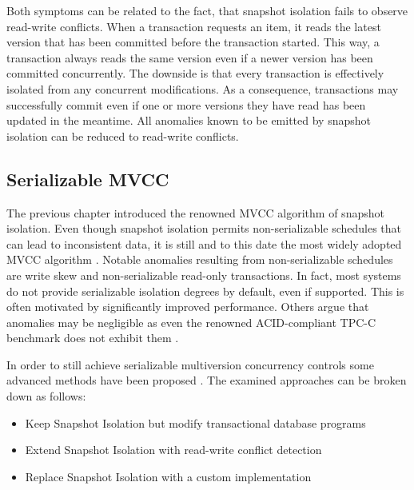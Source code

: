 Both symptoms can be related to the fact, that snapshot isolation fails to
observe read-write conflicts. When a transaction requests an item, it reads the
latest version that has been committed before the transaction started. This way,
a transaction always reads the same version even if a newer version has been
committed concurrently. The downside is that every transaction is effectively
isolated from any concurrent modifications. As a consequence, transactions may
successfully commit even if one or more versions they have read has been updated
in the meantime. All anomalies known to be emitted by snapshot isolation can be
reduced to read-write conflicts.

\subsection{Serializable MVCC}

The previous chapter introduced the renowned MVCC algorithm of snapshot
isolation. Even though snapshot isolation permits non-serializable schedules
that can lead to inconsistent data, it is still and to this date the most widely
adopted MVCC algorithm \cite{cahill2009serializable, larson2011high,
sikka2012efficient, neumann2015fast}. Notable anomalies resulting from
non-serializable schedules are write skew and non-serializable read-only
transactions. In fact, most systems do not provide serializable isolation
degrees by default, even if supported. This is often motivated by significantly
improved performance. Others argue that anomalies may be negligible as even the
renowned ACID-compliant TPC-C benchmark does not exhibit them
\cite{fekete2005making}.

In order to still achieve serializable multiversion concurrency controls some
advanced methods have been proposed \cite{fekete2005making,
cahill2009serializable, neumann2015fast}. The examined approaches can be broken
down as follows:

\begin{itemize}
    \item Keep Snapshot Isolation but modify transactional database programs
    \item Extend Snapshot Isolation with read-write conflict detection
    \item Replace Snapshot Isolation with a custom implementation
\end{itemize}
